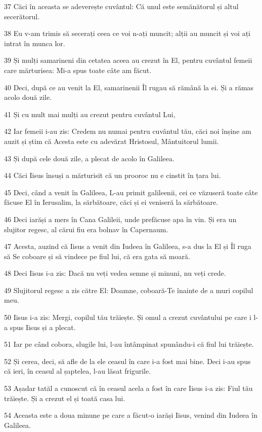 \par 37 Căci în aceasta se adeverește cuvântul: Că unul este semănătorul și altul secerătorul.
\par 38 Eu v-am trimis să secerați ceea ce voi n-ați muncit; alții au muncit și voi ați intrat în munca lor.
\par 39 Și mulți samarineni din cetatea aceea au crezut în El, pentru cuvântul femeii care mărturisea: Mi-a spus toate câte am făcut.
\par 40 Deci, după ce au venit la El, samarinenii Îl rugau să rămână la ei. Și a rămas acolo două zile.
\par 41 Și cu mult mai mulți au crezut pentru cuvântul Lui,
\par 42 Iar femeii i-au zis: Credem nu numai pentru cuvântul tău, căci noi înșine am auzit și știm că Acesta este cu adevărat Hristosul, Mântuitorul lumii.
\par 43 Și după cele două zile, a plecat de acolo în Galileea.
\par 44 Căci Iisus însuși a mărturisit că un prooroc nu e cinstit în țara lui.
\par 45 Deci, când a venit în Galileea, L-au primit galileenii, cei ce văzuseră toate câte făcuse El în Ierusalim, la sărbătoare, căci și ei veniseră la sărbătoare.
\par 46 Deci iarăși a mers în Cana Galileii, unde prefăcuse apa în vin. Și era un slujitor regesc, al cărui fiu era bolnav în Capernaum.
\par 47 Acesta, auzind că Iisus a venit din Iudeea în Galileea, s-a dus la El și Îl ruga să Se coboare și să vindece pe fiul lui, că era gata să moară.
\par 48 Deci Iisus i-a zis: Dacă nu veți vedea semne și minuni, nu veți crede.
\par 49 Slujitorul regesc a zis către El: Doamne, coboară-Te înainte de a muri copilul meu.
\par 50 Iisus i-a zis: Mergi, copilul tău trăiește. Și omul a crezut cuvântului pe care i l-a spus Iisus și a plecat.
\par 51 Iar pe când cobora, slugile lui, l-au întâmpinat spunându-i că fiul lui trăiește.
\par 52 Și cerea, deci, să afle de la ele ceasul în care i-a fost mai bine. Deci i-au spus că ieri, în ceasul al șaptelea, l-au lăsat frigurile.
\par 53 Așadar tatăl a cunoscut că în ceasul acela a fost în care Iisus i-a zis: Fiul tău trăiește. Și a crezut el și toată casa lui.
\par 54 Aceasta este a doua minune pe care a făcut-o iarăși Iisus, venind din Iudeea în Galileea.

